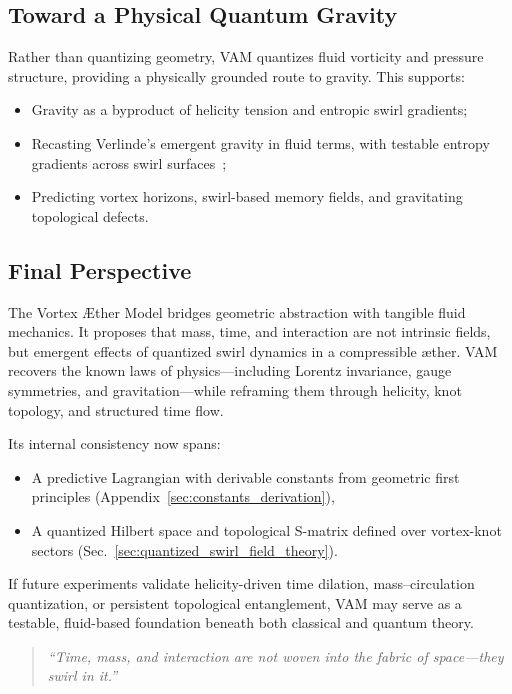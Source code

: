 \documentclass[preprint]{revtex4-2}
\begin{document}
    \subsection*{Toward a Physical Quantum Gravity}
    Rather than quantizing geometry, VAM quantizes fluid vorticity and pressure structure, providing a physically grounded route to gravity. This supports:

    \begin{itemize}
        \item Gravity as a byproduct of helicity tension and entropic swirl gradients;
        \item Recasting Verlinde’s emergent gravity in fluid terms, with testable entropy gradients across swirl surfaces~\cite{kiehn2005topological};
        \item Predicting vortex horizons, swirl-based memory fields, and gravitating topological defects.
    \end{itemize}

    \subsection*{Final Perspective}
    The Vortex \AE{}ther Model bridges geometric abstraction with tangible fluid mechanics. It proposes that mass, time, and interaction are not intrinsic fields, but emergent effects of quantized swirl dynamics in a compressible æther. VAM recovers the known laws of physics—including Lorentz invariance, gauge symmetries, and gravitation—while reframing them through helicity, knot topology, and structured time flow.

    Its internal consistency now spans:

    \begin{itemize}
        \item A predictive Lagrangian with derivable constants from geometric first principles (Appendix~\ref{sec:constants_derivation}),
        \item A quantized Hilbert space and topological S-matrix defined over vortex-knot sectors (Sec.~\ref{sec:quantized_swirl_field_theory}).
    \end{itemize}

    If future experiments validate helicity-driven time dilation, mass–circulation quantization, or persistent topological entanglement, VAM may serve as a testable, fluid-based foundation beneath both classical and quantum theory.

    \begin{quote}
    \emph{``Time, mass, and interaction are not woven into the fabric of space—they swirl in it.''}
    \end{quote}
\end{document}
